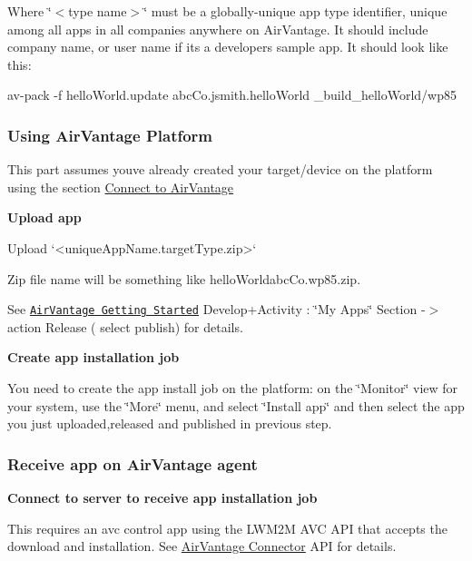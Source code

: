 Where \char`\"{}$<$type name$>$\char`\"{} must be a globally-\/unique app type identifier, unique among all apps in all companies anywhere on Air\+Vantage. It should include company name, or user name if it\textquotesingle{}s a developer\textquotesingle{}s sample app. It should look like this\+:

\begin{DoxyVerb} av-pack -f helloWorld.update abcCo.jsmith.helloWorld _build_helloWorld/wp85
\end{DoxyVerb}
\hypertarget{how_to_a_v_install_app_appInstallAirVantage_usingAv}{}\subsubsection{Using Air\+Vantage Platform}\label{how_to_a_v_install_app_appInstallAirVantage_usingAv}
This part assumes you\textquotesingle{}ve already created your target/device on the platform using the section \hyperlink{connecting_air_vantage}{Connect to Air\+Vantage}

{\bfseries Upload app}

\begin{DoxyVerb}Upload `<uniqueAppName.targetType.zip>`
\end{DoxyVerb}


Zip file name will be something like {\ttfamily hello\+Worldabc\+Co.\+wp85.\+zip}.

See \href{https://doc.airvantage.net/display/USERGUIDE/Getting+Started}{\tt Air\+Vantage Getting Started} Develop+\+Activity \+: \char`\"{}\+My
\+Apps\char`\"{} Section -\/$>$ action Release ( select publish) for details.

{\bfseries Create app installation job}

You need to create the app install job on the platform\+: on the \char`\"{}\+Monitor\char`\"{} view for your system, use the \char`\"{}\+More\char`\"{} menu, and select \char`\"{}\+Install app\char`\"{} and then select the app you just uploaded,released and published in previous step.\hypertarget{how_to_a_v_install_app_appInstallAirVantage_rcvAppAgent}{}\subsubsection{Receive app on Air\+Vantage agent}\label{how_to_a_v_install_app_appInstallAirVantage_rcvAppAgent}
{\bfseries Connect to server to receive app installation job}

This requires an {\ttfamily avc} control app using the L\+W\+M2\+M A\+V\+C A\+P\+I that accepts the download and installation. See \hyperlink{c_le_avc}{Air\+Vantage Connector} A\+P\+I for details.

